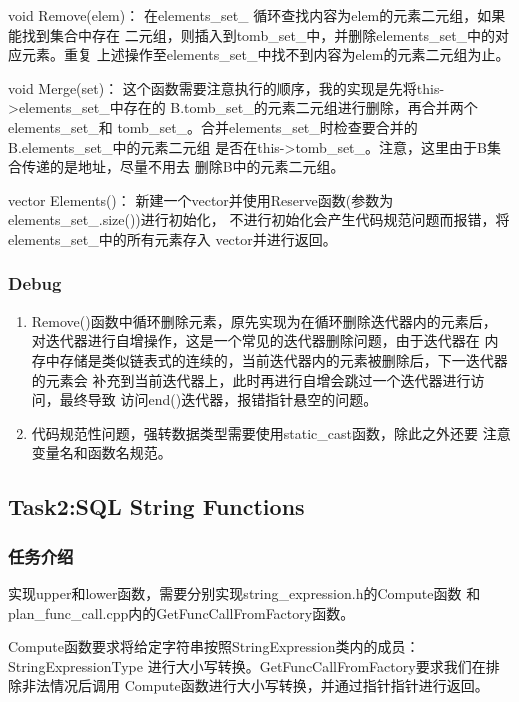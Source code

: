\documentclass[a4paper]{article}
\begin{document}
void Remove(elem)：
      在elements\_set\_ 循环查找内容为elem的元素二元组，如果能找到集合中存在
      二元组，则插入到tomb\_set\_中，并删除elements\_set\_中的对应元素。重复
      上述操作至elements\_set\_中找不到内容为elem的元素二元组为止。

void Merge(set)：
      这个函数需要注意执行的顺序，我的实现是先将this->elements\_set\_中存在的
      B.tomb\_set\_的元素二元组进行删除，再合并两个elements\_set\_和
      tomb\_set\_。合并elements\_set\_时检查要合并的B.elements\_set\_中的元素二元组
      是否在this->tomb\_set\_。注意，这里由于B集合传递的是地址，尽量不用去
      删除B中的元素二元组。

vector Elements()：
      新建一个vector并使用Reserve函数(参数为elements\_set\_.size())进行初始化，
      不进行初始化会产生代码规范问题而报错，将elements\_set\_中的所有元素存入
      vector并进行返回。

\subsubsection{Debug}

\begin{enumerate}
   \item Remove()函数中循环删除元素，原先实现为在循环删除迭代器内的元素后，
   对迭代器进行自增操作，这是一个常见的迭代器删除问题，由于迭代器在
   内存中存储是类似链表式的连续的，当前迭代器内的元素被删除后，下一迭代器的元素会
   补充到当前迭代器上，此时再进行自增会跳过一个迭代器进行访问，最终导致
   访问end()迭代器，报错指针悬空的问题。
   \item 代码规范性问题，强转数据类型需要使用static\_cast函数，除此之外还要
   注意变量名和函数名规范。
 \end{enumerate}

\subsection{Task2:SQL String Functions}

\subsubsection{任务介绍}

实现upper和lower函数，需要分别实现string\_expression.h的Compute函数
和plan\_func\_call.cpp内的GetFuncCallFromFactory函数。

Compute函数要求将给定字符串按照StringExpression类内的成员：StringExpressionType
进行大小写转换。GetFuncCallFromFactory要求我们在排除非法情况后调用
Compute函数进行大小写转换，并通过指针指针进行返回。
\end{document}
